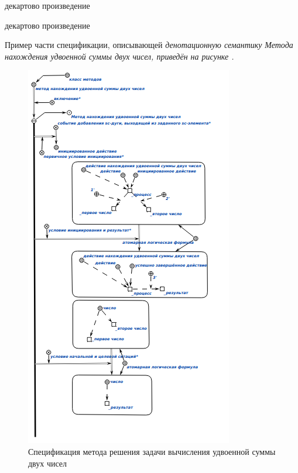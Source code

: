\begin{SCn}
\begin{scnindent}
\end{scnindent}
\begin{scnindent}
    \begin{scnreltovector}{декартово произведение}
    \end{scnreltovector}
\end{scnindent}
\begin{scnindent}
    \begin{scnreltovector}{декартово произведение}
    \end{scnreltovector}
\end{scnindent}
\end{SCn}

Пример части спецификации, описывающей \textit{денотационную семантику} \textit{Метода нахождения удвоенной суммы двух чисел, приведён на рисунке .
}
\begin{figure}[htbp]
  \center
  \includegraphics[scale=0.7]{author/part3/figures/condition_and_result.png}
  \caption{Спецификация метода решения задачи вычисления удвоенной суммы двух чисел}
  \label{fig:condition_and_result}
\end{figure}


